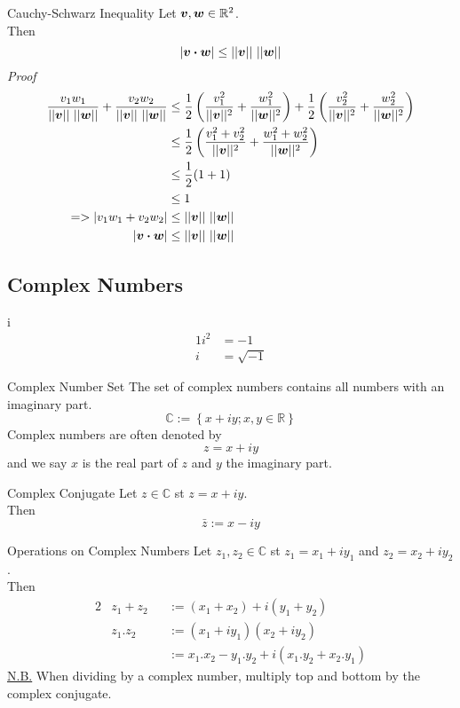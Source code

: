 \documentclass[11pt,a4paper]{article}
\begin{document}
\subtitle{Theorem 1.10 - }{Cauchy-Schwarz Inequality}
Let $\boldsymbol{v}, \boldsymbol{w} \in \mathbb{R}^2$. \\
Then $$|\boldsymbol{v} \boldsymbol{\cdot} \boldsymbol{w}| \leq ||\boldsymbol{v}||\ ||\boldsymbol{w}||$$
%
\textit{Proof}
\begin{align*}
  \frac{v_1w_1}{||\boldsymbol{v}||\ ||\boldsymbol{w}||} + \frac{v_2w_2}{||\boldsymbol{v}||\ ||\boldsymbol{w}||} &\leq \frac{1}{2}\left(\frac{v_{1}^{2}}{||\boldsymbol{v}||^2} + \frac{w_{1}^{2}}{||\boldsymbol{w}||^2}\right) + \frac{1}{2}\left(\frac{v_{2}^{2}}{||\boldsymbol{v}||^2} + \frac{w_{2}^{2}}{||\boldsymbol{w}||^2}\right) \\
  &\leq \frac{1}{2}\left(\frac{v_{1}^{2} + v_{2}^{2}}{||\boldsymbol{v}||^2} + \frac{w_{1}^{2} + w_{2}^{2}}{||\boldsymbol{w}||^2}\right) \\
  &\leq \frac{1}{2}(1 + 1) \\
  &\leq 1 \\
  => |v_1w_1 + v_2w_2| &\leq ||\boldsymbol{v}||\ ||\boldsymbol{w}|| \\
  |\boldsymbol{v} \boldsymbol{\cdot} \boldsymbol{w}| &\leq ||\boldsymbol{v}||\ ||\boldsymbol{w}|| \\
\end{align*}

\subsection{Complex Numbers}

\subtitle{Definition 1.11 - }{i}
\begin{alignat*}{1}
  i^2 &= -1 \\
  i &= \sqrt{-1}
\end{alignat*}

\subtitle{Definition 1.12 - }{Complex Number Set}
The set of complex numbers contains all numbers with an imaginary part. $$\mathbb{C} := \left\{x + iy; x,y \in \mathbb{R}\right\}$$
Complex numbers are often denoted by $$z = x + iy$$ and we say $x$ is the real part of $z$ and $y$ the imaginary part.

\subtitle{Definition 1.13 - }{Complex Conjugate}
Let $z \in \mathbb{C}$ st $z = x + iy$. \\
Then $$\bar{z} := x - iy$$
%
\newpage
%
\subtitle{Theorem 1.14 - }{Operations on Complex Numbers}
Let $z_1,z_2 \in \mathbb{C}$ st $z_1 = x_1 + iy_1$ and $z_2 = x_2 + iy_2$. \\
Then \begin{alignat*}{2}
  &z_1 + z_2 &&:= (x_1 + x_2) + i(y_1 + y_2) \\
  &z_1.z_2 &&:= (x_1 + iy_1)(x_2 + iy_2) \\
  & && := x_1.x_2 - y_1.y_2 + i(x_1.y_2 + x_2.y_1)
\end{alignat*}
\underline{N.B.} When dividing by a complex number, multiply top and bottom by the complex conjugate. \\
\end{document}
